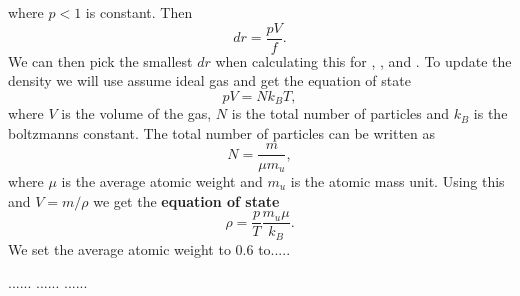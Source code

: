 \documentclass{article}
\begin{document}
where $p<1$ is constant. Then
\begin{equation*}
    dr = \frac{pV}{f}.
\end{equation*}
We can then pick the smallest $dr$ when calculating this for \label{eq:dm_dr}, \label{eq:dp_dr}, \label{eq:dT_dr} and \label{eq:ds_dr}. To update the density we will use assume ideal gas and get the equation of state
\begin{equation*}
    pV = Nk_B T,
\end{equation*}
where $V$ is the volume of the gas, $N$ is the total number of particles and $k_B$ is the boltzmanns constant. The total number of particles can be written as
\begin{equation*}
    N=\frac{m}{\mu m_u},
\end{equation*}
where $\mu$ is the average atomic weight and $m_u$ is the atomic mass unit. Using this and $V=m/\rho$ we get the \textbf{equation of state}
\begin{equation}\label{eq:eos}
    \rho = \frac{p}{T}\frac{m_u \mu}{k_B}.
\end{equation}
We set the average atomic weight to $0.6$ to.....


......
......
......





\end{document}
